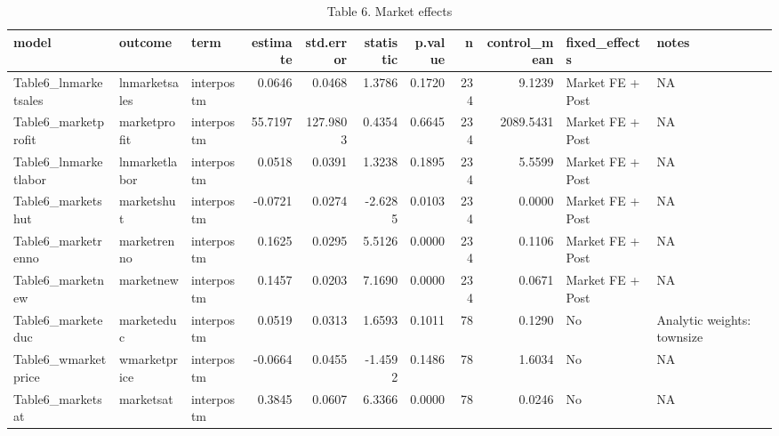 \begin{table}

\caption{Table 6. Market effects}
\centering
\begin{tabular}[t]{lllrrrrrrll}
\toprule
model & outcome & term & estimate & std.error & statistic & p.value & n & control\_mean & fixed\_effects & notes\\
\midrule
Table6\_lnmarketsales & lnmarketsales & interpostm & 0.0646 & 0.0468 & 1.3786 & 0.1720 & 234 & 9.1239 & Market FE + Post & NA\\
Table6\_marketprofit & marketprofit & interpostm & 55.7197 & 127.9803 & 0.4354 & 0.6645 & 234 & 2089.5431 & Market FE + Post & NA\\
Table6\_lnmarketlabor & lnmarketlabor & interpostm & 0.0518 & 0.0391 & 1.3238 & 0.1895 & 234 & 5.5599 & Market FE + Post & NA\\
Table6\_marketshut & marketshut & interpostm & -0.0721 & 0.0274 & -2.6285 & 0.0103 & 234 & 0.0000 & Market FE + Post & NA\\
Table6\_marketrenno & marketrenno & interpostm & 0.1625 & 0.0295 & 5.5126 & 0.0000 & 234 & 0.1106 & Market FE + Post & NA\\
\addlinespace
Table6\_marketnew & marketnew & interpostm & 0.1457 & 0.0203 & 7.1690 & 0.0000 & 234 & 0.0671 & Market FE + Post & NA\\
Table6\_marketeduc & marketeduc & interpostm & 0.0519 & 0.0313 & 1.6593 & 0.1011 & 78 & 0.1290 & No & Analytic weights: townsize\\
Table6\_wmarketprice & wmarketprice & interpostm & -0.0664 & 0.0455 & -1.4592 & 0.1486 & 78 & 1.6034 & No & NA\\
Table6\_marketsat & marketsat & interpostm & 0.3845 & 0.0607 & 6.3366 & 0.0000 & 78 & 0.0246 & No & NA\\
\bottomrule
\end{tabular}
\end{table}
